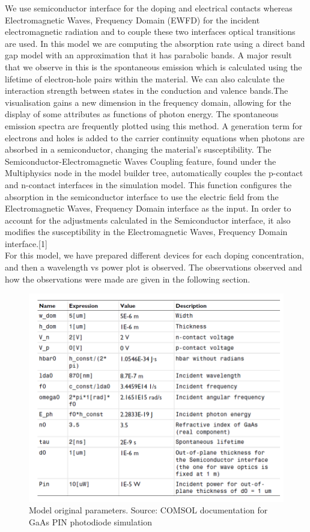 \documentclass[conference]{IEEEtran}
\begin{document}
We use semiconductor interface for the doping and electrical contacts whereas Electromagnetic Waves, Frequency Domain (EWFD) for the incident electromagnetic radiation and to couple these two interfaces optical transitions are used. In this model we are computing the absorption rate using a direct band gap model with an approximation that it has parabolic bands. A major result that we observe in this is the spontaneous emission which is calculated using the lifetime of electron-hole pairs within the material. We can also calculate the interaction strength between states in the conduction and valence bands.The visualisation gains a new dimension in the frequency domain, allowing for the display of some attributes as functions of photon energy. The spontaneous emission spectra are frequently plotted using this method. A generation term for electrons and holes is added to the carrier continuity equations when photons are absorbed in a semiconductor, changing the material's susceptibility. The Semiconductor-Electromagnetic Waves Coupling feature, found under the Multiphysics node in the model builder tree, automatically couples the p-contact and n-contact interfaces in the simulation model. This function configures the absorption in the semiconductor interface to use the electric field from the Electromagnetic Waves, Frequency Domain interface as the input. In order to account for the adjustments calculated in the Semiconductor interface, it also modifies the susceptibility in the Electromagnetic Waves, Frequency Domain interface.[1]\\

For this model, we have prepared different devices for each doping concentration, and then a wavelength vs power plot is observed. The observations observed and how the observations were made are given in the following section.


\begin{figure}
\begin{center}
\includegraphics[scale = 0.4]{Param.png}
\caption{Model original parameters. Source: COMSOL documentation for GaAs PIN photodiode simulation}
\end{center}
\end{figure}
\end{document}

